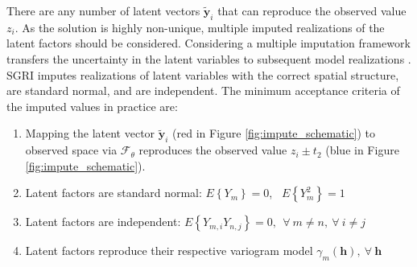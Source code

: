 There are any number of latent vectors $\tilde{\mathbf{y}}_{i}$ that can reproduce the observed value $z_{i}$. As the solution is highly non-unique, multiple imputed realizations of the latent factors should be considered. Considering a multiple imputation framework transfers the uncertainty in the latent variables to subsequent model realizations \citep{silva2017multiple}. \Gls{SGRI} imputes realizations of latent variables with the correct spatial structure, are standard normal, and are independent. The minimum acceptance criteria of the imputed values in practice are:

\begin{enumerate}[noitemsep]
    \item Mapping the latent vector $\tilde{\mathbf{y}}_{i}$ (red in Figure \ref{fig:impute_schematic}) to observed space via $\mathcal{F}_{\theta}$  reproduces the observed value $z_{i} \pm t_{2}$ (blue in Figure \ref{fig:impute_schematic}).
    \item Latent factors are standard normal: $E\left\{Y_{m}\right\}=0$, \ $E\left\{Y_{m}^{2}\right\}=1$
    \item Latent factors are independent: $E\left\{Y_{m,i}Y_{n,j}\right\}=0, \ \ \forall \ m\neq n, \ \forall \ i \neq j$
    \item Latent factors reproduce their respective variogram model $\gamma_m(\mathbf{h}), \ \forall \ \mathbf{h}$
\end{enumerate}

